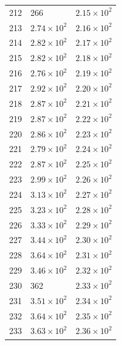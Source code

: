\begin{table}[H]
\begin{tabular}{lll}
212 & 266 & $\displaystyle 2.15 \times 10^{2}$ \\
213 & $\displaystyle 2.74 \times 10^{2}$ & $\displaystyle 2.16 \times 10^{2}$ \\
214 & $\displaystyle 2.82 \times 10^{2}$ & $\displaystyle 2.17 \times 10^{2}$ \\
215 & $\displaystyle 2.82 \times 10^{2}$ & $\displaystyle 2.18 \times 10^{2}$ \\
216 & $\displaystyle 2.76 \times 10^{2}$ & $\displaystyle 2.19 \times 10^{2}$ \\
217 & $\displaystyle 2.92 \times 10^{2}$ & $\displaystyle 2.20 \times 10^{2}$ \\
218 & $\displaystyle 2.87 \times 10^{2}$ & $\displaystyle 2.21 \times 10^{2}$ \\
219 & $\displaystyle 2.87 \times 10^{2}$ & $\displaystyle 2.22 \times 10^{2}$ \\
220 & $\displaystyle 2.86 \times 10^{2}$ & $\displaystyle 2.23 \times 10^{2}$ \\
221 & $\displaystyle 2.79 \times 10^{2}$ & $\displaystyle 2.24 \times 10^{2}$ \\
222 & $\displaystyle 2.87 \times 10^{2}$ & $\displaystyle 2.25 \times 10^{2}$ \\
223 & $\displaystyle 2.99 \times 10^{2}$ & $\displaystyle 2.26 \times 10^{2}$ \\
224 & $\displaystyle 3.13 \times 10^{2}$ & $\displaystyle 2.27 \times 10^{2}$ \\
225 & $\displaystyle 3.23 \times 10^{2}$ & $\displaystyle 2.28 \times 10^{2}$ \\
226 & $\displaystyle 3.33 \times 10^{2}$ & $\displaystyle 2.29 \times 10^{2}$ \\
227 & $\displaystyle 3.44 \times 10^{2}$ & $\displaystyle 2.30 \times 10^{2}$ \\
228 & $\displaystyle 3.64 \times 10^{2}$ & $\displaystyle 2.31 \times 10^{2}$ \\
229 & $\displaystyle 3.46 \times 10^{2}$ & $\displaystyle 2.32 \times 10^{2}$ \\
230 & 362 & $\displaystyle 2.33 \times 10^{2}$ \\
231 & $\displaystyle 3.51 \times 10^{2}$ & $\displaystyle 2.34 \times 10^{2}$ \\
232 & $\displaystyle 3.64 \times 10^{2}$ & $\displaystyle 2.35 \times 10^{2}$ \\
233 & $\displaystyle 3.63 \times 10^{2}$ & $\displaystyle 2.36 \times 10^{2}$ \\

\end{tabular}
\end{table}
